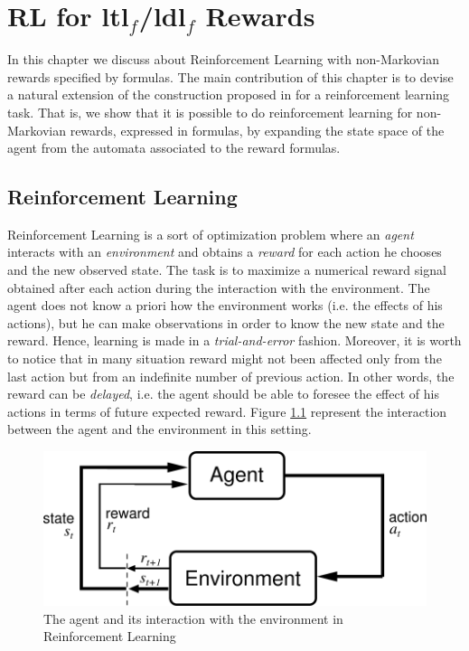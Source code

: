 \chapter{RL for {\sc ltl}$_f$/{\sc ldl}$_f$ Rewards}
\label{ch:rl}

In this chapter we discuss about Reinforcement Learning with non-Markovian rewards specified by \LLf formulas. The main contribution of this chapter is to devise a natural extension of the construction proposed in \citep{AAAI1817342} for a reinforcement learning task. That is, we show that it is possible to do reinforcement learning for non-Markovian rewards, expressed in \LLf formulas, by expanding the state space of the agent from the automata associated to the \LLf reward formulas.


\section{Reinforcement Learning}
\label{RL}
Reinforcement Learning \citep{Sutton:1998:IRL:551283} is a sort of optimization problem where an \emph{agent} interacts with an \emph{environment} and obtains a \emph{reward} for each action he chooses and the new observed state. The task is to maximize a numerical reward signal obtained after each action during the interaction with the environment. The agent does not know a priori how the environment works (i.e. the effects of his actions), but he can make observations in order to know the new state and the reward. Hence, learning is made in a \emph{trial-and-error} fashion. Moreover, it is worth to notice that in many situation reward might not been affected only from the last action but from an indefinite number of previous action. In other words, the reward can be \emph{delayed}, i.e. the agent should be able to foresee the effect of his actions in terms of future expected reward. Figure \ref{fig:agent-environment} represent the interaction between the agent and the environment in this setting.
\begin{figure}[!h]
	\centering
	\includegraphics[width=.8\linewidth]{images/agent-environment}
	\caption{The agent and its interaction with the environment in Reinforcement Learning}\label{fig:agent-environment}
\end{figure}

